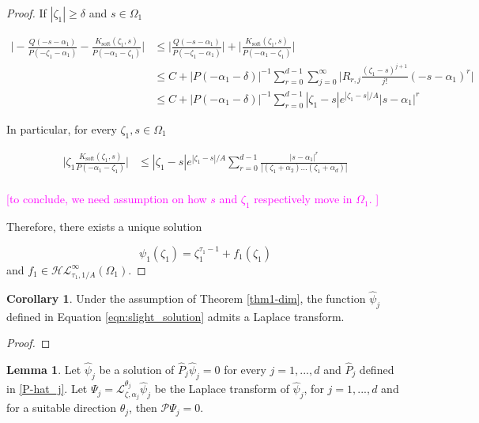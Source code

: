 \documentclass{article}
\theoremstyle{definition}
\newcommand{\laplace}{\mathcal{L}}
\newtheorem{corollary}[theorem]{Corollary}
\newtheorem{lemma}[definition]{Lemma}
\begin{document}
\begin{proof}
If $|\zeta_1|\geq\delta$ and $s\in\Omega_1$

\begin{align*}
    \Big\vert-\frac{Q(-s-\alpha_1)}{P(-\zeta_1-\alpha_1)}-\frac{K_{\text{soft}}(\zeta_1,s)}{P(-\alpha_1-\zeta_1)}\Big\vert&\leq  \Big\vert\frac{Q(-s-\alpha_1)}{P(-\zeta_1-\alpha_1)}\Big\vert+\Big\vert\frac{K_{\text{soft}}(\zeta_1,s)}{P(-\alpha_1-\zeta_1)}\Big\vert\\
    &\leq C+ |P(-\alpha_1-\delta)|^{-1} \sum_{r=0}^{d-1}\sum_{j=0}^{\infty} \Big\vert R_{r,j}\frac{(\zeta_1-s)^{j+1}}{j!}(-s-\alpha_1)^r\Big\vert\\
    &\leq C + |P(-\alpha_1-\delta)|^{-1} \sum_{r=0}^{d-1}|\zeta_1-s|e^{|\zeta_1-s|/A} |s-\alpha_1|^r
\end{align*}

In particular, for every $\zeta_1,s\in\Omega_1$

\begin{align*}
    \Big\vert \zeta_1 \frac{K_{\text{soft}}(\zeta_1,s)}{P(-\alpha_1-\zeta_1)}\Big\vert&\leq |\zeta_1-s| e^{|\zeta_1-s|/A} \sum_{r=0}^{d-1}\frac{|s-\alpha_1|^r}{|(\zeta_1+\alpha_2)...(\zeta_1+\alpha_d)|}\\
\end{align*}

\textcolor{magenta}{[to conclude, we need assumption on how $s$ and $\zeta_1$ respectively move in $\Omega_1$. ]}


Therefore, there exists a unique solution 

\begin{equation}\label{eqn:slight_solution}
    \psi_1(\zeta_1)=\zeta_1^{\tau_1-1}+f_1(\zeta_1)
\end{equation}
 and $f_1\in\mathcal{HL}^{\infty}_{\tau_1,1/A}(\Omega_1)$.  

 
\end{proof}

\begin{corollary}\label{cor:existence_Laplace}
    Under the assumption of Theorem \ref{thm1-dim}, the function $\hat{\psi}_j$ defined in Equation \eqref{eqn:slight_solution} admits a Laplace transform. 
\end{corollary}

\begin{proof}
    
\end{proof}

\begin{lemma}
 Let $\hat{\psi}_j$ be a solution of $\hat{P}_j\hat{\psi}_j=0$ for every $j=1,...,d$ and $\hat{P}_j$ defined in \eqref{P-hat_j}. Let $\Psi_j=\laplace_{\zeta,\alpha_j}^{\theta_j}\hat{\psi}_j$ be the Laplace transform of $\hat{\psi}_j$, for $j=1,...,d$ and for a suitable direction $\theta_j$, then $\mathcal{P}\Psi_j=0$.   
\end{lemma}
\end{document}
